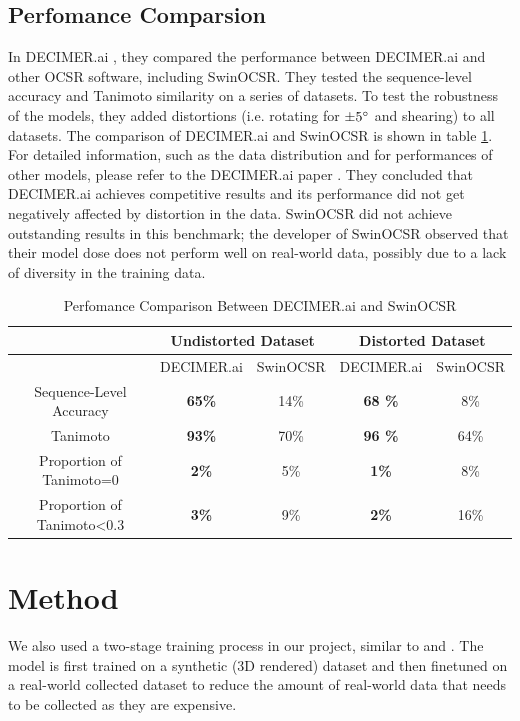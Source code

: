 \documentclass[12pt]{article}
\begin{document}

\subsection{Perfomance Comparsion}
In DECIMER.ai \autocite{decimer}, they compared the performance between DECIMER.ai and other OCSR software, including SwinOCSR. They tested the sequence-level accuracy and Tanimoto similarity on a series of datasets. To test the robustness of the models, they added distortions (i.e. rotating for $\pm5\degree$ and shearing) to all datasets. The comparison of DECIMER.ai and SwinOCSR is shown in table \ref{compare}. \autocite{decimer} For detailed information, such as the data distribution and for performances of other models, please refer to the DECIMER.ai paper \autocite{decimer}. They concluded that DECIMER.ai achieves competitive results and its performance did not get negatively affected by distortion in the data. SwinOCSR did not achieve outstanding results in this benchmark; the developer of SwinOCSR observed that their model dose does not perform well on real-world data, possibly due to a lack of diversity in the training data. \autocite{decimer} \autocite{swinocsr} 

\begin{table}[]
    \centering
    \begin{tabular}{c|c|c|c|c|}
      &  \multicolumn{2}{c|}{Undistorted Dataset} & \multicolumn{2}{c|}{Distorted Dataset} \\ \hline
      & DECIMER.ai & SwinOCSR & DECIMER.ai & SwinOCSR \\ \hline
     Sequence-Level Accuracy & \textbf{65\%} & 14\% & \textbf{68 \%}  & 8\%\\
     Tanimoto & \textbf{93\%} & 70\% & \textbf{96 \%} & 64\%\\
     Proportion of Tanimoto=0 & \textbf{2\%} & 5\% & \textbf{1\%} & 8\%\\
     Proportion of Tanimoto<0.3 & \textbf{3\%} & 9\% & \textbf{2\%} &16\%\\

    \end{tabular}
    \caption{Perfomance Comparison Between DECIMER.ai and SwinOCSR}
    \label{compare}
\end{table}
\section{Method}
We also used a two-stage training process in our project, similar to \autocite{decimer} and \autocite{chempix}. The model is first trained on a synthetic (3D rendered) dataset and then finetuned on a real-world collected dataset to reduce the amount of real-world data that needs to be collected as they are expensive.  
\end{document}
